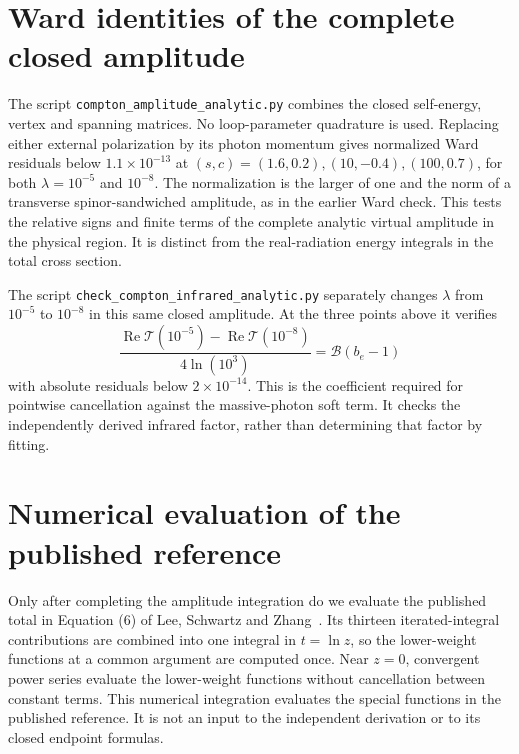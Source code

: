\section{Ward identities of the complete closed amplitude}
The script \nolinkurl{compton_amplitude_analytic.py} combines the
closed self-energy, vertex and spanning matrices. No loop-parameter
quadrature is used. Replacing either external polarization by its
photon momentum gives normalized Ward residuals below
$1.1\times10^{-13}$ at
$(s,c)=(1.6,0.2),(10,-0.4),(100,0.7)$, for both
$\lambda=10^{-5}$ and $10^{-8}$. The normalization is the larger
of one and the norm of a transverse spinor-sandwiched amplitude,
as in the earlier Ward check. This tests the relative signs and
finite terms of the complete analytic virtual amplitude in the
physical region. It is distinct from the real-radiation energy integrals in the
total cross section.

The script \nolinkurl{check_compton_infrared_analytic.py} separately
changes $\lambda$ from $10^{-5}$ to $10^{-8}$ in this same closed
amplitude. At the three points above it verifies
\begin{equation}
 \frac{\operatorname{Re}\mathcal T(10^{-5})
       -\operatorname{Re}\mathcal T(10^{-8})}{4\ln(10^3)}
       =\mathcal B(b_e-1)
\end{equation}
with absolute residuals below $2\times10^{-14}$. This is the
coefficient required for pointwise cancellation against the
massive-photon soft term. It checks the independently derived
infrared factor, rather than determining that factor by fitting.




\section{Numerical evaluation of the published reference}
Only after completing the amplitude integration do we evaluate the
published total in Equation (6) of Lee, Schwartz and
Zhang~\cite{qed-processes-lsz}.  Its thirteen iterated-integral contributions
are combined into one integral in $t=\ln z$, so the lower-weight functions
at a common argument are computed once.  Near $z=0$, convergent power
series evaluate the lower-weight functions without cancellation between
constant terms.  This numerical integration evaluates the special
functions in the published reference.  It is not an input to the
independent derivation or to its closed endpoint formulas.

